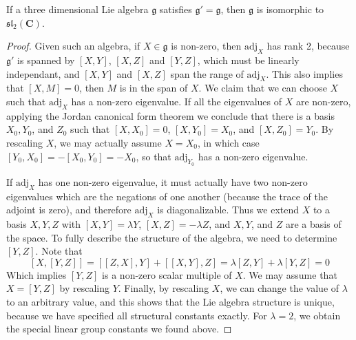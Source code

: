 \begin{theorem}
    If a three dimensional Lie algebra $\mathfrak{g}$ satisfies $\mathfrak{g}' = \mathfrak{g}$, then $\mathfrak{g}$ is isomorphic to $\mathfrak{sl}_2(\mathbf{C})$.
\end{theorem}
\begin{proof}
Given such an algebra, if $X \in \mathfrak{g}$ is non-zero, then $\text{adj}_X$ has rank 2, because $\mathfrak{g}'$ is spanned by $[X,Y]$, $[X,Z]$ and $[Y,Z]$, which must be linearly independant, and $[X,Y]$ and $[X,Z]$ span the range of $\text{adj}_X$. This also implies that $[X,M] = 0$, then $M$ is in the span of $X$. We claim that we can choose $X$ such that $\text{adj}_X$ has a non-zero eigenvalue. If all the eigenvalues of $X$ are non-zero, applying the Jordan canonical form theorem we conclude that there is a basis $X_0, Y_0$, and $Z_0$ such that $[X,X_0] = 0$, $[X,Y_0] = X_0$, and $[X,Z_0] = Y_0$. By rescaling $X$, we may actually assume $X = X_0$, in which case $[Y_0,X_0] = -[X_0,Y_0] = -X_0$, so that $\text{adj}_{Y_0}$ has a non-zero eigenvalue.

If $\text{adj}_X$ has one non-zero eigenvalue, it must actually have two non-zero eigenvalues which are the negations of one another (because the trace of the adjoint is zero), and therefore $\text{adj}_X$ is diagonalizable. Thus we extend $X$ to a basis $X,Y,Z$ with $[X,Y] = \lambda Y$, $[X,Z] = -\lambda Z$, and $X,Y$, and $Z$ are a basis of the space. To fully describe the structure of the algebra, we need to determine $[Y,Z]$. Note that
%
\[ [X,[Y,Z]] = [[Z,X],Y] + [[X,Y],Z] = \lambda [Z,Y] + \lambda [Y,Z] = 0 \]
%
Which implies $[Y,Z]$ is a non-zero scalar multiple of $X$. We may assume that $X = [Y,Z]$ by rescaling $Y$. Finally, by rescaling $X$, we can change the value of $\lambda$ to an arbitrary value, and this shows that the Lie algebra structure is unique, because we have specified all structural constants exactly. For $\lambda = 2$, we obtain the special linear group constants we found above.
\end{proof}







































